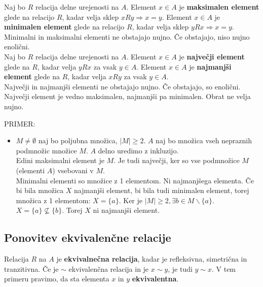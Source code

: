 \documentclass[a4paper,12pt]{article}
\begin{document}
Naj bo $R$ relacija delne urejenosti na $A$. Element $x\in A$ je \textbf{maksimalen element} glede na relacijo $R$, kadar velja sklep $xRy\Rightarrow x=y$. Element $x\in A$ je \textbf{minimalen element} glede na relacijo $R$, kadar velja sklep $yRx\Rightarrow x=y$. \\

Minimalni in maksimalni elementi ne obstajajo nujno. Če obstajajo, niso nujno enolični. \\

Naj bo $R$ relacija delne urejenosti na $A$. Element $x\in A$ je \textbf{največji element} glede na $R$, kadar velja $yRx$ za vsak $y\in A$. Element $x\in A$ je \textbf{najmanjši element} glede na $R$, kadar velja $xRy$ za vsak $y\in A$. \\

Največji in najmanjši elementi ne obstajajo nujno. Če obstajajo, so enolični. Največji element je vedno maksimalen, najmanjši pa minimalen. Obrat ne velja nujno. \\

\newpage 

PRIMER:
\begin{itemize}
\item $M\neq \emptyset$ naj bo poljubna množica, $|M|\geq 2$. $A$ naj bo množica vseh nepraznih podmnožic množice $M$. $A$ delno uredimo z inkluzijo. \\

Edini maksimalni element je $M$. Je tudi največji, ker so vse podmnožice $M$ (elementi $A$) vsebovani v $M$. \\

Minimalni elementi so množice z 1 elementom. Ni najmanjšega elementa. Če bi bila množica $X$ najmanjši element, bi bila tudi minimalen element, torej množica z 1 elementom: $X=\{a\}$. Ker je $|M|\geq 2,\exists b \in M \backslash \{a\}$. $X=\{a\} \not\subseteq \{b\}$. Torej $X$ ni najmanjši element.\\
\end{itemize} 

\subsection{Ponovitev ekvivalenčne relacije}

Relacija $R$ na $A$ je \textbf{ekvivalnečna relacija}, kadar je refleksivna, simetrična in tranzitivna. Če je $\sim$ ekvivalenčna relacija in je $x\sim y$, je tudi $y\sim x$. V tem primeru pravimo, da sta elementa $x$ in $y$ \textbf{ekvivalentna}. \\
\end{document}
